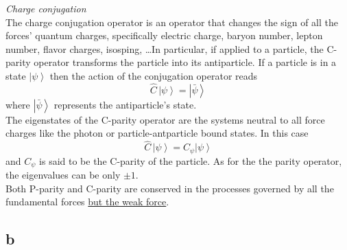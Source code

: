 \raggedright\emph{Charge conjugation} \\
\vspace{10pt} 
The charge conjugation operator is an operator that changes the sign of all the forces' quantum charges, specifically electric charge, baryon number, lepton number, flavor charges, isosping, \dots In particular, if applied to a particle, the C-parity operator 
transforms the particle into its antiparticle. If a particle is in a state $\left| \psi \right\rangle$ then the action of the conjugation operator reads 
\begin{equation*}
    \hat C \, \left| \psi \right\rangle = \left| \bar\psi \right\rangle
\end{equation*}
where $\left| \bar\psi \right\rangle$ represents the antiparticle's state. \\
The eigenstates of the C-parity operator are the systems neutral to all force charges like the photon or particle-antparticle bound states. In this case
\begin{equation*}
    \hat C \, \left| \psi \right\rangle = C_{\psi} \left| \psi \right\rangle
\end{equation*}
and $C_{\psi}$ is said to be the C-parity of the particle. As for the the parity operator, the eigenvalues can be only $\pm 1$. \\
Both P-parity and C-parity are conserved in the processes governed by all the fundamental forces \href{https://en.wikipedia.org/wiki/Weak_interaction#Violation_of_symmetry}{but the weak force}.

\subsection*{b}

